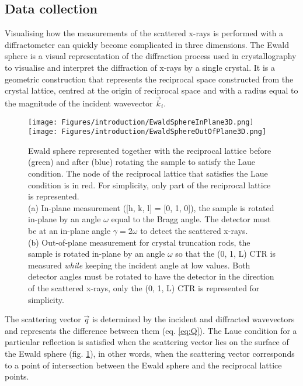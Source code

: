 \subsection{Data collection} \label{sec:DataCollectionSXRD}

Visualising how the measurements of the scattered x-rays is performed with a diffractometer can quickly become complicated in three dimensions.
The Ewald sphere is a visual representation of the diffraction process used in crystallography to visualise and interpret the diffraction of x-rays by a single crystal.
It is a geometric construction that represents the reciprocal space constructed from  the crystal lattice, centred at the origin of reciprocal space and with a radius equal to the magnitude of the incident wavevector $\vec{k}_i$.

\begin{figure}[!htb]
    \centering
    \texttt{[image: Figures/introduction/EwaldSphereInPlane3D.png]}
    \texttt{[image: Figures/introduction/EwaldSphereOutOfPlane3D.png]}
    \caption{
    Ewald sphere represented together with the reciprocal lattice before (green) and after (blue) rotating the sample to satisfy the Laue condition.
    The node of the reciprocal lattice that satisfies the Laue condition is in red.
    For simplicity, only part of the reciprocal lattice is represented.\\
    (a) In-plane measurement ([h, k, l] = [0, 1, 0]), the sample is rotated in-plane by an angle $\omega$ equal to the Bragg angle.
    The detector must be at an in-plane angle $\gamma=2\omega$ to detect the scattered x-rays.\\
    (b) Out-of-plane measurement for crystal truncation rods, the sample is rotated in-plane by an angle $\omega$ so that the (0, 1, L) CTR is measured \textit{while} keeping the incident angle at low values.
    Both detector angles must be rotated to have the detector in the direction of the scattered x-rays, only the (0, 1, L) CTR is represented for simplicity.
    }
    \label{fig:EwaldSphere}
\end{figure}

The scattering vector $\vec{q}$ is determined by the incident and diffracted wavevectors and represents the difference between them (eq. \ref{eq:Q}).
The Laue condition for a particular reflection is satisfied when the scattering vector lies on the surface of the Ewald sphere (fig. \ref{fig:EwaldSphere}), in other words, when the scattering vector corresponds to a point of intersection between the Ewald sphere and the reciprocal lattice points.

